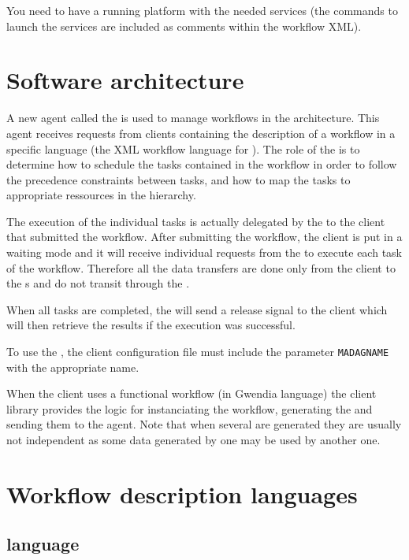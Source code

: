 You need to have a running \diet platform with the needed services (the
commands to launch the services are included as comments within the workflow
XML).

\section{Software architecture}

A new agent called the \textit{\madag} is used to manage workflows in the \diet
architecture. This agent receives requests from clients containing the
description of a workflow in a specific language (the \madag XML workflow
language for \DAGS). The role of the \madag is to determine how to schedule the
tasks contained in the workflow in order to follow the precedence constraints
between tasks, and how to map the tasks to appropriate ressources in the \diet
hierarchy.

The execution of the individual tasks is actually delegated by the \madag to
the client that submitted the workflow. After submitting the workflow, the
client is put in a waiting mode and it will receive individual requests from
the \madag to execute each task of the workflow. Therefore all the data
transfers are done only from the client to the {\sed}s and do not transit
through the \madag.

When all tasks are completed, the \madag will send a release signal to the
client which will then retrieve the results if the execution was successful.

To use the \madag, the client configuration file must include the parameter
\texttt{MADAGNAME} with the appropriate name.

When the client uses a functional workflow (in Gwendia language) the \diet
client library provides the logic for instanciating the workflow, generating
the \DAGS and sending them to the \madag agent. Note that when several \DAGS are
generated they are usually not independent as some data generated by one \DAG
may be used by another one.

\section{Workflow description languages}

\subsection{\madag language}
\label{sec:dag_desc}

